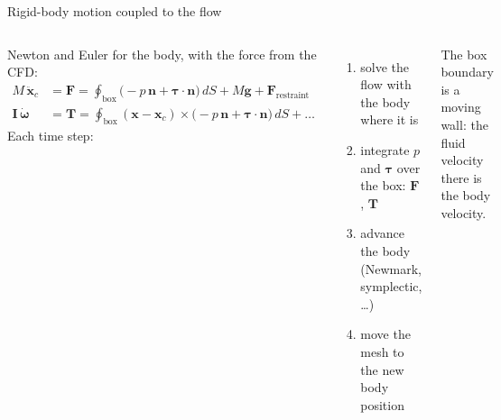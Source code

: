 \documentclass[aspectratio=169,10pt]{beamer}
\begin{document}
\begin{frame}{Rigid-body motion coupled to the flow}
  \begin{columns}[T]
    \small
    Newton and Euler for the body, with the force from the CFD:
    \begin{align*}
      M\,\ddot{\mathbf{x}}_c &= \mathbf{F} = \oint_{\text{box}} \big(-p\,\mathbf{n} + \boldsymbol\tau\cdot\mathbf{n}\big)\,dS + M\mathbf{g} + \mathbf{F}_{\text{restraint}}\\
      \mathbf{I}\,\dot{\boldsymbol\omega} &= \mathbf{T} = \oint_{\text{box}} (\mathbf{x}-\mathbf{x}_c)\times\big(-p\,\mathbf{n} + \boldsymbol\tau\cdot\mathbf{n}\big)\,dS + \dots
    \end{align*}
    Each time step:
    \begin{enumerate}
      \item solve the flow with the body where it is
      \item integrate $p$ and $\boldsymbol\tau$ over the box: $\mathbf{F}$, $\mathbf{T}$
      \item advance the body (Newmark, symplectic, \dots)
      \item move the mesh to the new body position
    \end{enumerate}
    The box boundary is a moving wall: the fluid velocity there is the body velocity.
    \centering
  \end{columns}
\end{frame}
\end{document}
